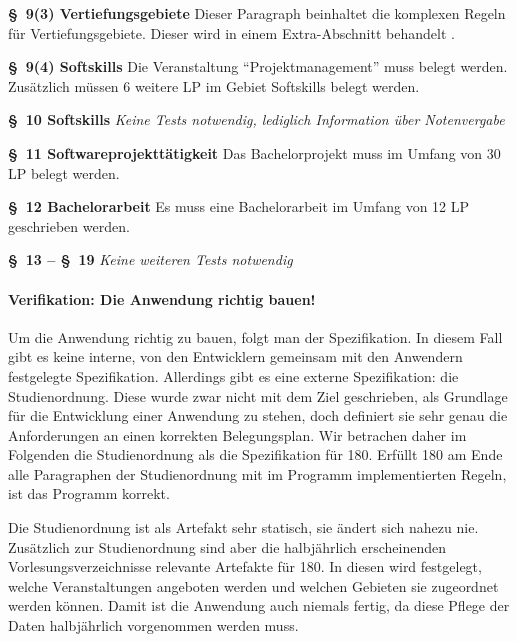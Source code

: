 \documentclass[ngerman]{article}
\begin{document}
\begin{paracol}{2}
\textbf{§~9(3) Vertiefungsgebiete}
\switchcolumn
Dieser Paragraph beinhaltet die komplexen Regeln für Vertiefungsgebiete.
Dieser wird in einem Extra-Abschnitt behandelt .
\\
\switchcolumn*

\textbf{§~9(4) Softskills}
\switchcolumn
Die Veranstaltung ``Projektmanagement'' muss belegt werden.
Zusätzlich müssen 6 weitere LP im Gebiet Softskills belegt werden.
\\
\switchcolumn*

\textbf{§~10 Softskills}
\switchcolumn
\emph{Keine Tests notwendig, lediglich Information über Notenvergabe}
\\
\switchcolumn*

\textbf{§~11 Softwareprojekttätigkeit}
\switchcolumn
Das Bachelorprojekt muss im Umfang von 30 LP belegt werden.
\\
\switchcolumn*

\textbf{§~12 Bachelorarbeit}
\switchcolumn
Es muss eine Bachelorarbeit im Umfang von 12 LP geschrieben werden.
\\
\switchcolumn*

\textbf{§~13 -- §~19}
\switchcolumn
\emph{Keine weiteren Tests notwendig}
\\
\switchcolumn*
\end{paracol}

\paragraph{Verifikation: Die Anwendung richtig bauen!}

Um die Anwendung richtig zu bauen, folgt man der Spezifikation.
In diesem Fall gibt es keine interne, von den Entwicklern gemeinsam mit den Anwendern festgelegte Spezifikation.
Allerdings gibt es eine externe Spezifikation: die Studienordnung.
Diese wurde zwar nicht mit dem Ziel geschrieben, als Grundlage für die Entwicklung einer Anwendung zu stehen, doch definiert sie sehr genau die Anforderungen an einen korrekten Belegungsplan.
Wir betrachen daher im Folgenden die Studienordnung als die Spezifikation für 180.
Erfüllt 180 am Ende alle Paragraphen der Studienordnung mit im Programm implementierten Regeln, ist das Programm korrekt.

Die Studienordnung ist als Artefakt sehr statisch, sie ändert sich nahezu nie.
Zusätzlich zur Studienordnung sind aber die halbjährlich erscheinenden Vorlesungsverzeichnisse relevante Artefakte für 180.
In diesen wird festgelegt, welche Veranstaltungen angeboten werden und welchen Gebieten sie zugeordnet werden können.
Damit ist die Anwendung auch niemals fertig, da diese Pflege der Daten halbjährlich vorgenommen werden muss.
\end{document}
